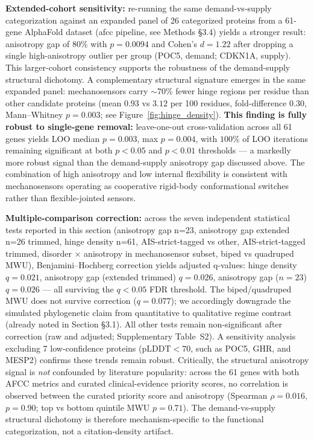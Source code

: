 \textbf{Extended-cohort sensitivity:} re-running the same demand-vs-supply categorization against an expanded panel of 26 categorized proteins from a 61-gene AlphaFold dataset (afcc pipeline, see Methods §3.4) yields a stronger result: anisotropy gap of 80\% with $p = 0.0094$ and Cohen's $d = 1.22$ after dropping a single high-anisotropy outlier per group (POC5, demand; CDKN1A, supply). This larger-cohort consistency supports the robustness of the demand-supply structural dichotomy. A complementary structural signature emerges in the same expanded panel: mechanosensors carry $\sim 70\%$ fewer hinge regions per residue than other candidate proteins (mean $0.93$ vs $3.12$ per 100 residues, fold-difference $0.30$, Mann--Whitney $p = 0.003$; see Figure~\ref{fig:hinge_density}). \textbf{This finding is fully robust to single-gene removal:} leave-one-out cross-validation across all 61 genes yields LOO median $p = 0.003$, max $p = 0.004$, with $100\%$ of LOO iterations remaining significant at both $p<0.05$ and $p<0.01$ thresholds --- a markedly more robust signal than the demand-supply anisotropy gap discussed above. The combination of high anisotropy and low internal flexibility is consistent with mechanosensors operating as cooperative rigid-body conformational switches rather than flexible-jointed sensors.

\textbf{Multiple-comparison correction:} across the seven independent statistical tests reported in this section (anisotropy gap n=23, anisotropy gap extended n=26 trimmed, hinge density n=61, AIS-strict-tagged vs other, AIS-strict-tagged trimmed, disorder $\times$ anisotropy in mechanosensor subset, biped vs quadruped MWU), Benjamini--Hochberg correction yields adjusted q-values: hinge density $q = 0.021$, anisotropy gap (extended trimmed) $q = 0.026$, anisotropy gap ($n=23$) $q = 0.026$ --- all surviving the $q < 0.05$ FDR threshold. The biped/quadruped MWU does not survive correction ($q = 0.077$); we accordingly downgrade the simulated phylogenetic claim from quantitative to qualitative regime contrast (already noted in Section §3.1). All other tests remain non-significant after correction (raw and adjusted; Supplementary Table~S2). A sensitivity analysis excluding 7 low-confidence proteins ($\text{pLDDT} < 70$, such as POC5, GHR, and MESP2) confirms these trends remain robust. Critically, the structural anisotropy signal is \emph{not} confounded by literature popularity: across the 61 genes with both AFCC metrics and curated clinical-evidence priority scores, no correlation is observed between the curated priority score and anisotropy (Spearman $\rho = 0.016$, $p = 0.90$; top vs bottom quintile MWU $p = 0.71$). The demand-vs-supply structural dichotomy is therefore mechanism-specific to the functional categorization, not a citation-density artifact.

